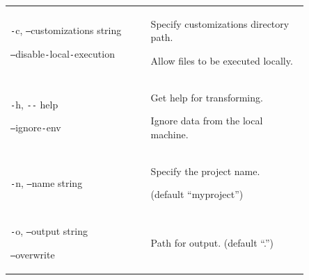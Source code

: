 \documentclass[twocolumn]{article}
\newcommand{\lightlexendfont}[1]{{\lightlexendfontfamily #1}}
\newcommand{\tfontsize}{\fontsize{6}{12}\selectfont}
\newcommand{\dash}{\texttt{-}}
\newcommand{\doubledash}{\texttt{--}}
\begin{document}
{{{\begin{table}[H]
{\begin{tabular}{|>{\tfontsize}p{0.4\linewidth}|>{\tfontsize}p{0.45\linewidth}|}
{        \vspace{0.25\baselineskip}

        Sets output config file location.

      (default “.”)}                                                                                                         \\
      \hline \dash c, \doubledash customizations string

      \vspace{0.25\baselineskip}

      \hspace{0.3cm} \doubledash disable\dash local\dash execution & \lightlexendfont{Specify customizations directory path.

        \vspace{0.25\baselineskip}

      Allow files to be executed locally.}                                                                                   \\ 
      \hline

      \dash h, \texttt{-{}-} help

      \vspace{0.25\baselineskip}

      \hspace{0.3cm} \doubledash ignore\dash env                   & \lightlexendfont{Get help for transforming.

        \vspace{0.25\baselineskip}

      Ignore data from the local machine.}                                                                                   \\ 
      \hline \dash n, \doubledash name string                          & \lightlexendfont{Specify the project name.

      (default “myproject”)}                                                                                                 \\
      \hline
      \dash o, \doubledash output string

      \vspace{0.25\baselineskip}

      \hspace{0.36cm}\doubledash overwrite                         & \lightlexendfont{Path for output. (default “.”)

        \vspace{0.25\baselineskip}

}
\end{tabular}}
\end{table}}}}
\end{document}
